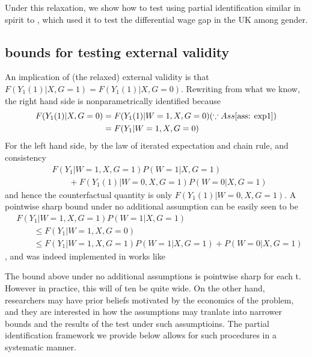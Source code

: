 \documentclass{article}
\begin{document}
Under this relaxation, we show how to test using partial identification similar in spirit to \cite{blundell2007changes}, which used it to test the differential wage gap in the UK among gender.
\subsection{  bounds for testing external validity}
\label{sec:uniform bound 1}
An implication of (the relaxed) external validity is that $ F(Y_1(1) | X, G=1) = F(Y_1(1) | X, G=0) $. Rewriting from what we know, the right hand side is nonparametrically identified because  
\begin{align}
    F(Y_1(1) | X, G=0) &= F(Y_1(1) | W=1, X, G=0 ) (\because Ass \ref{ass: exp1} )\\
    &= F(Y_1| W=1, X, G=0)
\end{align}
For the left hand side, by the law of iterated expectation and chain rule, and consistency
\begin{align}
    &F(Y_1 | W=1,X,G=1) P(W=1 | X, G=1) \\
    &\hspace{2em}+ F(Y_1(1) | W=0 , X, G=1)  P(W=0 | X, G=1)
\end{align}%
and hence the counterfactual quantity is only $F(Y_1(1) | W=0, X, G=1) $.
A pointwise sharp bound under no additional assumption can be easily seen to be 
\begin{align}
    &F(Y_1 | W=1,X,G=1) P(W=1| X, G=1) \\
    &\hspace{2em}\leq F(Y_1| W=1, X, G=0) \\ 
    &\hspace{2em}\leq F(Y_1 | W=1,X,G=1) P(W=1 | X, G=1) + P(W=0 | X, G=1)
\end{align}
, and was indeed implemented in works like \cite{blundell2007changes}\cite{manski2009identification}

The bound above under no additional assumptions is pointwise sharp for each t. However in practice, this will of ten be quite wide. On the other hand, researchers may have prior beliefs motivated by the economics of the problem, and they are interested in how the assumptions may tranlate into narrower bounds and the results of the test under such assumptioins. The partial identification framework we provide below allows for such procedures in a systematic manner.
 
\end{document}
